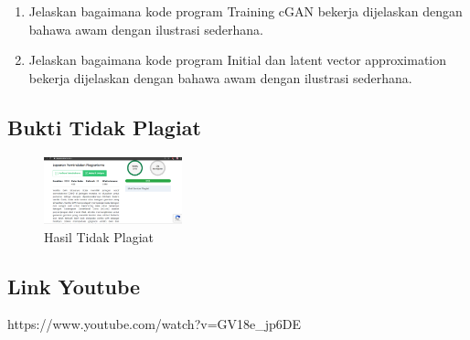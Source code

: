 \begin{enumerate}
\item Jelaskan bagaimana kode program Training cGAN bekerja dijelaskan dengan bahawa awam dengan ilustrasi sederhana.

	\hfill\break
	 
	
\item Jelaskan bagaimana kode program Initial dan latent vector approximation bekerja dijelaskan dengan bahawa awam dengan ilustrasi sederhana.

	\hfill\break
	 

\end{enumerate}

\subsection{Bukti Tidak Plagiat}
\begin{figure}
	\includegraphics[width=4cm]{figures/1174062/9/buktiplagiat.png}
	\centering
	\caption{Hasil Tidak Plagiat}
\end{figure}

\subsection{Link Youtube}
https://www.youtube.com/watch?v=GV18e_jp6DE